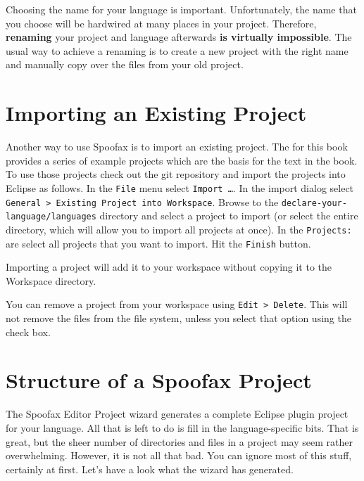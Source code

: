 Choosing the name for your language is important. Unfortunately, the name that
you choose will be hardwired at many places in your project. Therefore,
\textbf{renaming} your project and language afterwards \textbf{is virtually
impossible}.
The usual way to achieve a renaming is to create a new project with the right
name and manually copy over the files from your old project.

\section{Importing an Existing Project}

Another way to use Spoofax is to import an existing project. The
 for this book provides a series of example
projects which are the basis for the text in the book. To use those projects
check out the git repository and import the projects into Eclipse as follows.
In the \texttt{File} menu select \texttt{Import \ldots}. In the import dialog
select \texttt{General > Existing Project into Workspace}. Browse to the
\texttt{declare-your-language/languages} directory and select a project to
import (or select the entire directory, which will allow you to import all
projects at once). In the \texttt{Projects:} are select all projects that you
want to import. Hit the \texttt{Finish} button. 

Importing a project will add it to your workspace without copying it to the
Workspace directory.

You can remove a project from your workspace using \texttt{Edit > Delete}. This
will not remove the files from the file system, unless you select that option
using the check box.

\section{Structure of a Spoofax Project}

The Spoofax Editor Project wizard generates a complete Eclipse plugin project
for your language. All that is left to do is fill in the language-specific bits.
That is great, but the sheer number of directories and files in a project may
seem rather overwhelming. However, it is not all that bad. You can ignore most
of this stuff, certainly at first. Let's have a look what the wizard has
generated.


